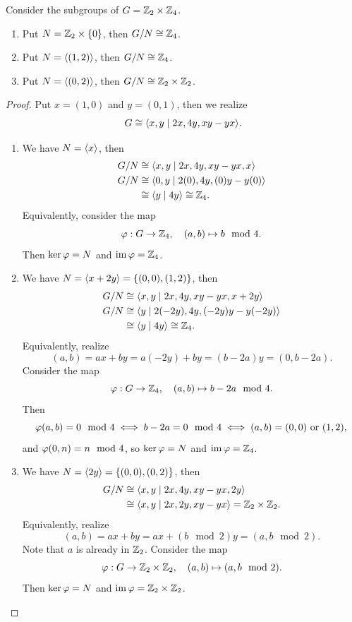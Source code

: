 \newpage
\begin{example}
  Consider the subgroups of \(G = \mathbb{Z}_2\times\mathbb{Z}_4\).
  \begin{enumerate}
    \item Put \(N = \mathbb{Z}_2\times\{0\}\), then \(G/N \cong \mathbb{Z}_4\).
    \item Put \(N = \langle(1,2)\rangle\), then \(G/N \cong \mathbb{Z}_4\).
    \item Put \(N = \langle(0,2)\rangle\), then \(G/N \cong \mathbb{Z}_2\times\mathbb{Z}_2\).
  \end{enumerate}
\end{example}
\begin{proof}
  Put \(x = (1,0)\) and \(y = (0,1)\), then we realize \[
    G \cong \langle x,y \mid 2x, 4y, xy - yx \rangle.
  \]
  \begin{enumerate}
    \item We have \(N = \langle x\rangle\), then \begin{align*}
      G/N &\cong \langle x,y \mid 2x, 4y, xy - yx, x \rangle \\
      G/N &\cong \langle0,y \mid 2(0), 4y, (0)y - y(0) \rangle \\
      &\cong \langle y \mid 4y\rangle \cong \mathbb{Z}_4.
    \end{align*}
    Equivalently, consider the map \[
      \varphi:G\to\mathbb{Z}_4, \quad
      (a,b)\mapsto b\mod 4.
    \]
    Then \(\ker\varphi = N\) and \(\operatorname{im}\varphi = \mathbb{Z}_4\).

    \item We have \(N = \langle x + 2y\rangle = \{(0,0),(1,2)\}\), then \begin{align*}
      G/N &\cong \langle x,y \mid 2x, 4y, xy - yx, x + 2y \rangle \\
      G/N &\cong \langle y \mid 2(-2y), 4y, (-2y)y - y(-2y) \rangle \\
      &\cong \langle y \mid 4y\rangle \cong \mathbb{Z}_4.
    \end{align*}
    Equivalently, realize \[
      (a,b) = ax + by = a(-2y) + by = (b - 2a)y = (0, b - 2a).
    \] Consider the map \[
      \varphi:G\to\mathbb{Z}_4, \quad
      (a,b)\mapsto b - 2a \mod 4.
    \]
    Then \[
      \varphi(a,b) = 0 \mod 4 \iff b - 2a = 0 \mod 4 \iff (a,b) = (0,0) \text{ or } (1,2),
    \] and \(\varphi(0,n) = n \mod 4\), so \(\ker\varphi = N\) and \(\operatorname{im}\varphi = \mathbb{Z}_4\).

    \item We have \(N = \langle2y\rangle = \{(0,0),(0,2)\}\), then \begin{align*}
      G/N &\cong \langle x,y \mid 2x, 4y, xy - yx, 2y \rangle \\
      &\cong \langle x,y \mid 2x, 2y, xy - yx\rangle = \mathbb{Z}_2 \times \mathbb{Z}_2.
    \end{align*}
    Equivalently, realize \[
      (a,b) = ax + by = ax + (b\mod 2)y = (a, b\mod 2).
    \]
    Note that \(a\) is already in \(\mathbb{Z}_2\). Consider the map \[
      \varphi:G\to\mathbb{Z}_2\times\mathbb{Z}_2, \quad
      (a,b)\mapsto (a, b\mod 2).
    \]
    Then \(\ker\varphi = N\) and \(\operatorname{im}\varphi = \mathbb{Z}_2\times\mathbb{Z}_2\).
  \end{enumerate}
\end{proof}

